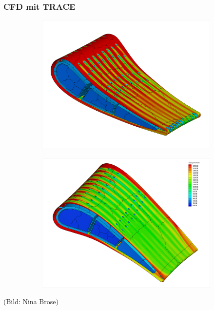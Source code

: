 \documentclass[8pt, aspectratio=169]{beamer}
\begin{document}
\begin{frame}
	\frametitle{CFD mit TRACE}
	\vspace{-1.5cm}\hspace{-0.5cm}
	\begin{figure}
		\begin{subfigure}{.49\textwidth}
			\centering
			\includegraphics[width=\textwidth, trim={50px 50px 50px 50px}, clip]{../../assets/ninacfd/pressureSide.png}
		\end{subfigure}
		\begin{subfigure}{.49\textwidth}
			\centering
			\includegraphics[width=\textwidth, trim={50px 50px 50px 50px}, clip]{../../assets/ninacfd/suctionSide.png}
		\end{subfigure}
	\end{figure}
	(Bild: Nina Brose)
\end{frame}
\end{document}
